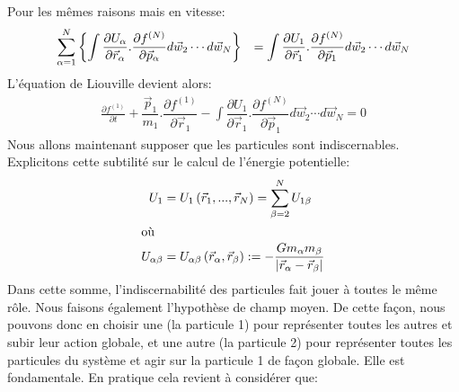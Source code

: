 Pour les mêmes raisons mais en vitesse:
\begin{align*}%
	\begin{array}[c]{ll}%
		\displaystyle\sum\limits_{\alpha=1}^{N}\left\{  \displaystyle\int%
		\dfrac{\partial U_{\alpha}}{\partial\vec{r}_{\alpha}}.\dfrac{\partial
		f^{(N)}}{\partial\vec{p}_{\alpha}}d\vec{w}_{2}\cdots d\vec{w}%
		_{N}\right\}   & =\displaystyle\int\dfrac{\partial U_{1}}{\partial
		\vec{r}_{1}}.\dfrac{\partial f^{(N)}}{\partial\vec{p}_{1}}%
		d\vec{w}_{2}\cdots d\vec{w}_{N}%
	\end{array}
\end{align*}
L'équation de Liouville devient alors:
\begin{align*}
	\frac{\partial f^{(1)}}{\partial t}+\dfrac{\vec{p}_{1}}{m_{1}}.\dfrac{\partial f^{(1)}}{\partial\vec{r}_{1}}-\displaystyle\int%
	\dfrac{\partial U_{1}}{\partial\vec{r}_{1}}.\dfrac{\partial f^{(N)}}{\partial\vec{p}_{1}}d\vec{w}_{2}\cdots d\vec{w}_{N}=0
\end{align*}
Nous allons maintenant supposer que les particules sont indiscernables.
Explicitons cette subtilité sur le calcul de l'énergie potentielle:
\begin{align*}
	U_{1} &  =U_{1}\left(  \vec{r}_{1},...,\vec{r}_{N}\right)  =\sum_{\beta=2}^{N}U_{1\beta}\\
	\intertext{où}
	U_{\alpha\beta} &  =U_{\alpha\beta}\left(  \vec{r}_{\alpha},\vec{r}_{\beta}\right)  :=-\frac{Gm_{\alpha}m_{\beta}}{\left\vert\vec{r}_{\alpha}-\vec{r}_{\beta}\right\vert }%
\end{align*}
Dans cette somme, l'indiscernabilité des particules fait jouer à toutes le même
rôle. Nous faisons également l'hypothèse de champ moyen. De cette façon, nous pouvons
donc en choisir une (la particule 1) pour représenter toutes les autres et
subir leur action globale, et une autre (la particule 2) pour représenter
toutes les particules du système et agir sur la particule 1 de façon globale.
Elle est fondamentale. En pratique cela revient à considérer que:
